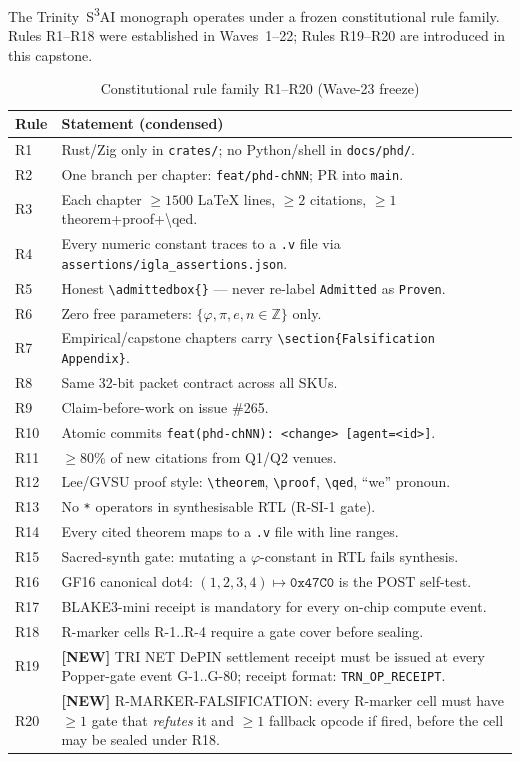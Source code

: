 The Trinity~S\textsuperscript{3}AI monograph operates under a frozen
constitutional rule family.  Rules R1--R18 were established in
Waves~1--22; Rules R19--R20 are introduced in this capstone.

\begin{table}[H]
\centering
\caption{Constitutional rule family R1--R20 (Wave-23 freeze)}
\label{tab74:rules}
\small
\begin{tabular}{lp{11cm}}
\toprule
Rule & Statement (condensed) \\
\midrule
R1  & Rust/Zig only in \texttt{crates/}; no Python/shell in \texttt{docs/phd/}. \\
R2  & One branch per chapter: \texttt{feat/phd-chNN}; PR into \texttt{main}. \\
R3  & Each chapter $\geq 1500$ LaTeX lines, $\geq 2$ citations, $\geq 1$ theorem+proof+\textbackslash{}qed. \\
R4  & Every numeric constant traces to a \texttt{.v} file via
      \texttt{assertions/igla\_assertions.json}. \\
R5  & Honest \texttt{\textbackslash{}admittedbox\{\}} — never re-label \texttt{Admitted} as \texttt{Proven}. \\
R6  & Zero free parameters: $\{\varphi,\pi,e,n\in\mathbb{Z}\}$ only. \\
R7  & Empirical/capstone chapters carry \texttt{\textbackslash{}section\{Falsification Appendix\}}. \\
R8  & Same 32-bit packet contract across all SKUs. \\
R9  & Claim-before-work on issue \#265. \\
R10 & Atomic commits \texttt{feat(phd-chNN): <change> [agent=<id>]}. \\
R11 & $\geq 80\%$ of new citations from Q1/Q2 venues. \\
R12 & Lee/GVSU proof style: \texttt{\textbackslash{}theorem}, \texttt{\textbackslash{}proof},
      \texttt{\textbackslash{}qed}, ``we'' pronoun. \\
R13 & No \texttt{*} operators in synthesisable RTL (R-SI-1 gate). \\
R14 & Every cited theorem maps to a \texttt{.v} file with line ranges. \\
R15 & Sacred-synth gate: mutating a $\varphi$-constant in RTL fails synthesis. \\
R16 & GF16 canonical dot4: $(1,2,3,4)\mapsto\mathtt{0x47C0}$ is the POST self-test. \\
R17 & BLAKE3-mini receipt is mandatory for every on-chip compute event. \\
R18 & R-marker cells R-1..R-4 require a gate cover before sealing. \\
R19 & \textbf{[NEW]} TRI NET DePIN settlement receipt must be issued at every
      Popper-gate event G-1..G-80; receipt format: \texttt{TRN\_OP\_RECEIPT}. \\
R20 & \textbf{[NEW]} R-MARKER-FALSIFICATION: every R-marker cell must have
      $\geq 1$ gate that \emph{refutes} it and $\geq 1$ fallback opcode
      if fired, before the cell may be sealed under R18. \\
\bottomrule
\end{tabular}
\end{table}


